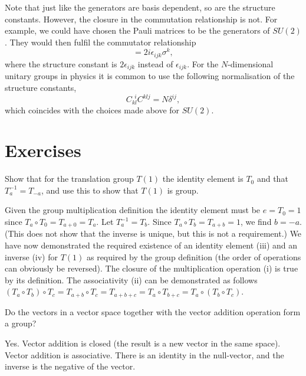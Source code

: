 \documentclass[notes.tex]{subfiles}
\begin{document}
Note that just like the generators are basis dependent, so are the structure constants. However, the closure in the commutation relationship is not. For example, we could have chosen the Pauli matrices to be the generators of $SU(2)$. They would then fulfil the commutator relationship
\begin{equation*}
[\sigma_i,\sigma_j]=2i\epsilon_{ijk}\sigma^k, 
\label{eq:pauli_algebra}
\end{equation*}
where the structure constant is $2\epsilon_{ijk}$ instead of $\epsilon_{ijk}$. For the $N$-dimensional unitary groups in physics it is common to use the following normalisation of the structure constants,
\begin{equation}
C_{kl}^{~~i}C_{}^{klj}=N\delta^{ij},
\label{eq:generator_normalisation}
\end{equation}
which coincides with the choices made above for $SU(2)$.



\section{Exercises}

\begin{Exercise}[difficulty=0]
Show that for the translation group $T(1)$ the identity element is $T_0$ and that $T_a^{-1} = T_{-a}$, and use this to show that $T(1)$ is group.
\end{Exercise}
\begin{Answer}
Given the group multiplication definition the identity element must be $e=T_0=1$ since $T_a\circ T_0=T_{a+0}=T_a$. Let $T_a^{-1} =T_b$. Since $T_a \circ T_b=T_{a+b}=1$, we find $b=-a$. (This does not show that the inverse is unique, but this is not a requirement.) We have now demonstrated the required existence of an identity element (iii) and an inverse (iv) for $T(1)$ as required by the group definition (the order of operations can obviously be reversed). The closure of the multiplication operation (i) is true by its definition. The associativity (ii) can be demonstrated as follows $(T_a\circ T_b)\circ T_c=T_{a+b}\circ T_c=T_{a+b+c}=T_{a}\circ T_{b+c}=T_a\circ (T_b\circ T_c)$.
\end{Answer}

\begin{Exercise}[difficulty=0]
Do the vectors in a vector space together with the vector addition operation form a group?
\end{Exercise}
\begin{Answer}
Yes. Vector addition is closed (the result is a new vector in the same space). Vector addition is associative. There is an identity in the null-vector, and the inverse is the negative of the vector.
\end{Answer}
\end{document}

